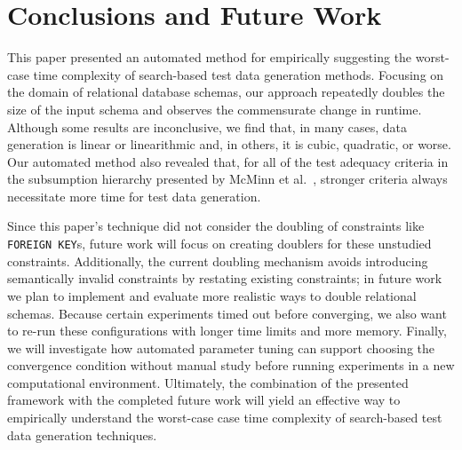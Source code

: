 
\section{Conclusions and Future Work}


This paper presented an automated method for empirically suggesting the worst-case time complexity of search-based test
data generation methods. Focusing on the domain of relational database schemas, our approach repeatedly doubles the size
of the input schema and observes the commensurate change in runtime. Although some results are inconclusive, we find
that, in many cases, data generation is linear or linearithmic and, in others, it is cubic, quadratic, or worse.  Our
automated method also revealed that, for all of the test adequacy criteria in the subsumption hierarchy presented by
McMinn et al.~\cite{mcminn2015}, stronger criteria always necessitate more time for test data generation.

Since this paper's technique did not consider the doubling of constraints like {\tt FOREIGN KEY}s, future work will
focus on creating doublers for these unstudied constraints. Additionally, the current doubling mechanism avoids
introducing semantically invalid constraints by restating existing constraints; in future work we plan to implement and
evaluate more realistic ways to double relational schemas. Because certain experiments timed out before converging, we
also want to re-run these configurations with longer time limits and more memory. Finally, we will investigate how
automated parameter tuning can support choosing the convergence condition without manual study before running
experiments in a new computational environment. Ultimately, the combination of the presented framework with the
completed future work will yield an effective way to empirically understand the worst-case case time complexity
of search-based test data generation techniques.
